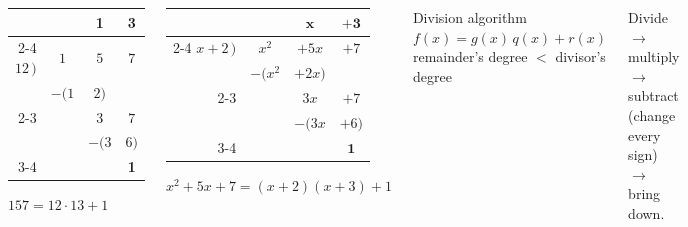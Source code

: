 \documentclass[aspectratio=169, 11pt]{beamer}
\begin{document}
\begin{frame}[t, plain]

  \begin{columns}[T]
      \begin{center}
      {\setlength{\tabcolsep}{3pt}\begin{tabular}{r@{\,}ccc}
                   &        & \textbf{1} & \textbf{3} \\ \cline{2-4}
        $12\,\big)$ & $1$    & $5$    & $7$    \\
                   & $-(1$  & $2)$   &        \\ \cline{2-3}
                   &        & $3$    & $7$    \\
                   &        & $-(3$  & $6)$   \\ \cline{3-4}
                   &        &        & \textbf{\color{redacc}1} \\
      \end{tabular}}

      \medskip
      $157 = 12 \cdot 13 + 1$
      \end{center}
      \begin{center}
      {\setlength{\tabcolsep}{3pt}\begin{tabular}{r@{\,}ccc}
                     &          & $\mathbf{x}$ & $\mathbf{+3}$ \\ \cline{2-4}
        $x+2\,\big)$ & $x^2$    & $+5x$    & $+7$    \\
                     & $-(x^2$  & $+2x)$   &         \\ \cline{2-3}
                     &          & $3x$     & $+7$    \\
                     &          & $-(3x$   & $+6)$   \\ \cline{3-4}
                     &          &          & {\color{redacc}$\mathbf{1}$} \\
      \end{tabular}}

      \medskip
      $x^2 + 5x + 7 = (x + 2)(x + 3) + 1$
      \end{center}
      \begin{block}{Division algorithm}
        $f(x) = g(x)\,q(x) + r(x)$\\[3pt]
        remainder's degree $<$ divisor's degree
      \end{block}
      \smallskip
      {\small Divide $\to$ multiply $\to$ subtract (change every sign) $\to$ bring down.}
  \end{columns}
\end{frame}
\end{document}
